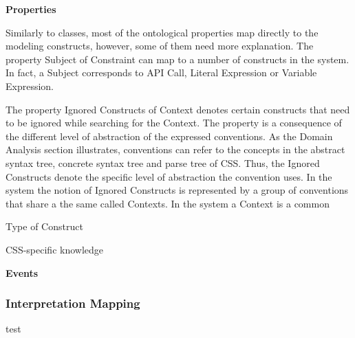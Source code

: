 \documentclass[parskip=full]{uvamscse}
\begin{document}
\textbf{Properties}

Similarly to classes, most of the ontological properties map directly to the modeling constructs,
however, some of them need more explanation. The property Subject of Constraint can map to a number
of constructs in the system. In fact, a Subject corresponds to API Call, Literal Expression or
Variable Expression.

The property Ignored Constructs of Context denotes certain constructs that need to be ignored while
searching for the Context. The property is a consequence of the different level of abstraction of
the expressed conventions. As the Domain Analysis section illustrates, conventions can refer to the
concepts in the abstract syntax tree, concrete syntax tree and parse tree of CSS. Thus, the Ignored
Constructs denote the specific level of abstraction the convention uses. In the system the notion of
Ignored Constructs is represented by a group of conventions that share a the same called Contexts. In the system a Context is a common 

Type of Construct 

CSS-specific knowledge

\textbf{Events}

\subsubsection{Interpretation Mapping}
test
\end{document}
